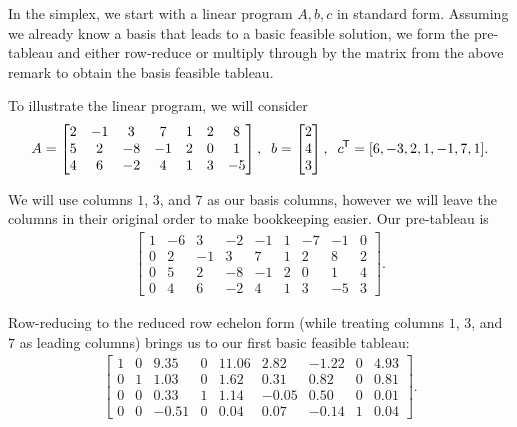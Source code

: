 In the simplex, we start with a linear program $A, b, c$ in standard form. Assuming we already know a basis that leads to a basic feasible solution, we form the pre-tableau and either row-reduce or multiply through by the matrix from the above remark to obtain the basis feasible tableau.

To illustrate the linear program, we will consider
\begin{align*}
    A =
    \begin{bmatrix}
        2 & -1 & 3 & 7 & 1 & 2 & 8 \\
        5 & 2 & -8 & -1 & 2 & 0 & 1 \\
        4 & 6 & -2 & 4 & 1 & 3 & -5
    \end{bmatrix},\;\;
    b = \begin{bmatrix}
        2 \\ 4 \\ 3
    \end{bmatrix},\;\;
    c^{\mkern-1.5mu\mathsf{T}} = [6, -3, 2, 1, -1, 7, 1].
\end{align*}

We will use columns $1$, $3$, and $7$ as our basis columns, however we will leave the columns in their original order to make bookkeeping easier. Our pre-tableau is
\begin{align*}
    \left[\begin{array}{c|ccccccc|c}
        1 & -6 & 3 & -2 & -1 & 1 & -7 & -1 & 0 \\
        \hline
        0 & 2 & -1 & 3 & 7 & 1 & 2 & 8 & 2 \\
        0 & 5 & 2 & -8 & -1 & 2 & 0 & 1 & 4 \\
        0 & 4 & 6 & -2 & 4 & 1 & 3 & -5 & 3
    \end{array}\right].
\end{align*}

Row-reducing to the reduced row echelon form (while treating columns $1$, $3$, and $7$ as leading columns) brings us to our first basic feasible tableau:
\begin{align*}
    \left[\begin{array}{c|ccccccc|c}
        1 & 0 & 9.35 & 0 & 11.06 & 2.82 & -1.22 & 0 & 4.93 \\
        \hline
        0 & 1 & 1.03 & 0 & 1.62 & 0.31 & 0.82 & 0 & 0.81 \\
        0 & 0 & 0.33 & 1 & 1.14 & -0.05 & 0.50 & 0 & 0.01 \\
        0 & 0 & -0.51 & 0 & 0.04 & 0.07 & -0.14 & 1 & 0.04
    \end{array}\right].
\end{align*}

